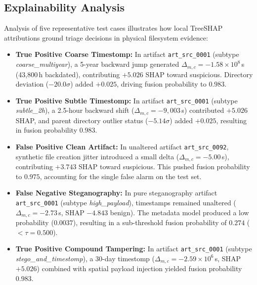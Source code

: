 \documentclass[conference]{IEEEtran}
\begin{document}
\subsection{Explainability Analysis}
Analysis of five representative test cases illustrates how local TreeSHAP attributions ground triage decisions in physical filesystem evidence:
\begin{itemize}
    \item \textbf{True Positive Coarse Timestomp:} In artifact \texttt{art\_src\_0001} (subtype \textit{coarse\_multiyear}), a 5-year backward jump generated $\Delta_{m,c} = -1.58 \times 10^8$\,s (43,800\,h backdated), contributing $+5.026$ SHAP toward suspicious. Directory deviation ($-20.0\sigma$) added $+0.025$, driving fusion probability to $0.983$.
    \item \textbf{True Positive Subtle Timestomp:} In artifact \texttt{art\_src\_0001} (subtype \textit{subtle\_2h}), a 2.5-hour backward shift ($\Delta_{m,c} = -9,003$\,s) contributed $+5.026$ SHAP, and parent directory outlier status ($-5.14\sigma$) added $+0.025$, resulting in fusion probability $0.983$.
    \item \textbf{False Positive Clean Artifact:} In unaltered artifact \texttt{art\_src\_0092}, synthetic file creation jitter introduced a small delta ($\Delta_{m,c} = -5.00$\,s), contributing $+3.743$ SHAP toward suspicious. This pushed fusion probability to $0.975$, accounting for the single false alarm on the test set.
    \item \textbf{False Negative Steganography:} In pure steganography artifact \texttt{art\_src\_0001} (subtype \textit{high\_payload}), timestamps remained unaltered ($\Delta_{m,c} = -2.73$\,s, SHAP $-4.843$ benign). The metadata model produced a low probability ($0.0037$), resulting in a sub-threshold fusion probability of $0.274$ ($< \tau = 0.500$).
    \item \textbf{True Positive Compound Tampering:} In artifact \texttt{art\_src\_0001} (subtype \textit{stego\_and\_timestomp}), a 30-day timestomp ($\Delta_{m,c} = -2.59 \times 10^6$\,s, SHAP $+5.026$) combined with spatial payload injection yielded fusion probability $0.983$.
\end{itemize}
\end{document}
